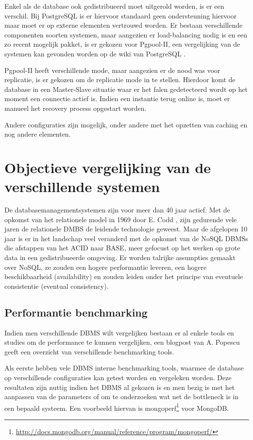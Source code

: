Enkel als de database ook gedistribueerd moet uitgerold worden, is er een verschil. Bij PostgreSQL is er hiervoor standaard geen ondersteuning hiervoor maar moet er op externe elementen vertrouwd worden. Er bestaan verschillende componenten soorten systemen, maar aangezien er load-balancing nodig is en een zo recent mogelijk pakket, is er gekozen voor Pgpool-II, een vergelijking van de systemen kan gevonden worden op de wiki van PostgreSQL \cite{postgresql-clustering}. 

Pgpool-II heeft verschillende mode, maar aangezien er de nood was voor replicatie, is er gekozen om de replicatie mode in te stellen. Hierdoor komt de database in een Master-Slave situatie waar er het falen gedetecteerd wordt op het moment een connectie actief is. Indien een instantie terug online is, moet er manueel het recovery process opgestart worden. 

Andere configuraties zijn mogelijk, onder andere met het opzetten van caching en nog andere elementen. 

\section{Objectieve vergelijking van de verschillende systemen}
De databasemanagementsystemen zijn voor meer dan 40 jaar actief. Met de opkomst van het relationele model in 1969 door E. Codd \cite{Codd:1970:RMD:362384.362685}, zijn gedurende vele jaren de relationele DMBS de leidende technologie geweest. Maar de afgelopen 10 jaar is er in het landschap veel veranderd met de opkomst van de NoSQL \glspl{DBMS} die afstappen van het ACID naar BASE, meer gefocust op het werken op grote data in een gedistribueerde omgeving. 
Er worden talrijke assumpties gemaakt over NoSQL, ze zouden een hogere performantie leveren, een hogere beschikbaarheid (availability) en zouden leiden onder het principe van eventuele consistentie (eventual consistency). 

\subsection{Performantie benchmarking} 
Indien men verschillende DBMS wilt vergelijken bestaan er al enkele tools en studies om de performance te kunnen vergelijken, een blogpost van A. Popescu \cite{PopescuBenchmarkOverview} geeft een overzicht van verschillende benchmarking tools. 

Als eerste hebben vele DBMS interne benchmarking tools, waarmee de database op verschillende configuraties kan getest worden en vergeleken worden. Deze resultaten zijn nuttig indien het \gls{DBMS} al gekozen is en men bezig is met het aanpassen van de parameters of om te onderzoeken wat net de bottleneck is in een bepaald systeem. Een voorbeeld hiervan is mongoperf\footnote{\url{http://docs.mongodb.org/manual/reference/program/mongoperf/}} voor MongoDB. 

